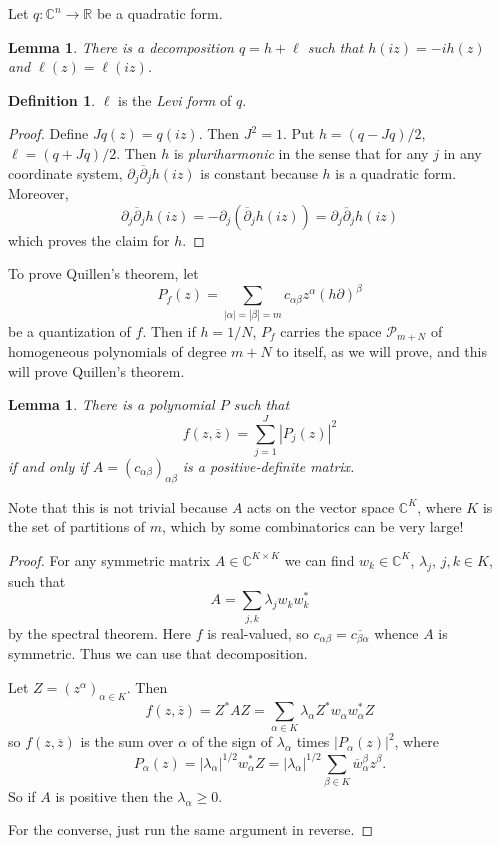 \documentclass[12pt]{report}
\newcommand{\RR}{\mathbb{R}}
\newcommand{\CC}{\mathbb{C}}
\newcommand{\dbar}{\overline \partial}
\newcommand{\dfn}[1]{\emph{#1}\index{#1}}
\newtheorem{lemma}[theorem]{Lemma}
\theoremstyle{definition}
\newtheorem{definition}[theorem]{Definition}
\begin{document}
    Let $q: \CC^n \to \RR$ be a quadratic form.
\begin{lemma}
    There is a decomposition $q = h + \ell$ such that $h(iz) = -ih(z)$ and $\ell(z) = \ell(iz)$.
\end{lemma}
\begin{definition}
    $\ell$ is the \dfn{Levi form} of $q$.
\end{definition}
\begin{proof}
    Define $Jq(z) = q(iz)$. Then $J^2 = 1$. Put $h = (q - Jq)/2$, $\ell = (q + Jq)/2$. Then $h$ is \dfn{pluriharmonic} in the sense that for any $j$ in any coordinate system, $\partial_j \dbar_j h(iz)$ is constant because $h$ is a quadratic form. Moreover,
    $$\partial_j \dbar_j h(iz) = -\partial_j(\dbar_jh(iz)) = \partial_j \dbar_j h(iz)$$
    which proves the claim for $h$.
\end{proof}
    To prove Quillen's theorem, let
    $$P_f(z) = \sum_{|\alpha| = |\beta| = m} c_{\alpha\beta} z^\alpha (h\partial)^\beta$$
    be a quantization of $f$. Then if $h = 1/N$, $P_f$ carries the space $\mathcal P_{m + N}$ of homogeneous polynomials of degree $m + N$ to itself, as we will prove, and this will prove Quillen's theorem.
\begin{lemma}
    There is a polynomial $P$ such that
    $$f(z, \overline z) = \sum_{j=1}^J |P_j(z)|^2$$
    if and only if $A = (c_{\alpha\beta})_{\alpha\beta}$ is a positive-definite matrix.
\end{lemma}
    Note that this is not trivial because $A$ acts on the vector space $\CC^K$, where $K$ is the set of partitions of $m$, which by some combinatorics can be very large!
\begin{proof}
    For any symmetric matrix $A \in \CC^{K \times K}$ we can find $w_k \in \CC^K$, $\lambda_j$, $j,k \in K$, such that
    $$A = \sum_{j,k} \lambda_j w_k w_k^*$$
    by the spectral theorem. Here $f$ is real-valued, so $c_{\alpha\beta} = \overline{c_{\beta\alpha}}$ whence $A$ is symmetric. Thus we can use that decomposition.

    Let $Z = (z^\alpha)_{\alpha \in K}$. Then
    $$f(z, \overline z) = Z^*AZ = \sum_{\alpha \in K} \lambda_\alpha Z^*w_\alpha w_\alpha^* Z$$
    so $f(z, \overline z)$ is the sum over $\alpha$ of the sign of $\lambda_\alpha$ times $|P_\alpha(z)|^2$, where
    $$P_\alpha(z) = |\lambda_\alpha|^{1/2} w_\alpha^* Z = |\lambda_\alpha|^{1/2} \sum_{\beta \in K} \overline w_\alpha^\beta z^\beta.$$
    So if $A$ is positive then the $\lambda_\alpha \geq 0$.

    For the converse, just run the same argument in reverse. 
\end{proof}
\end{document}
